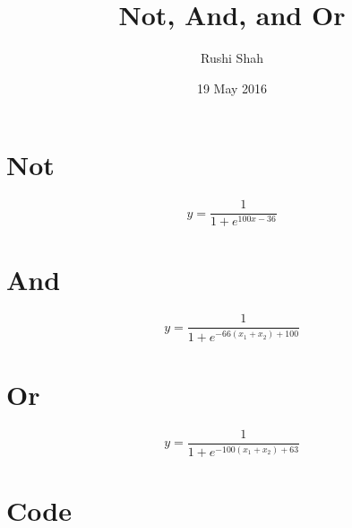 \documentclass{article}
\author{Rushi Shah}
\date{19 May 2016}
\title{Not, And, and Or}
\begin{document}
\maketitle 

\section{Not}   

\[
y = \frac{1}{1 + e^{100x - 36}}
\]

\section{And}

\[
y = \frac{1}{1 + e^{-66(x_1 + x_2) + 100}}
\]

\section{Or}

\[
y = \frac{1}{1 + e^{-100(x_1 + x_2) + 63}}
\]

\section{Code}

\inputminted{python}{script.py}
\end{document}
